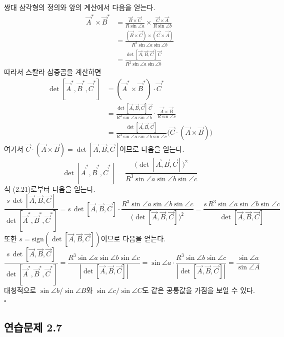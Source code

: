 \documentclass{article}
\begin{document}
쌍대 삼각형의 정의와 앞의 계산에서 다음을 얻는다.
\begin{align*}
  \vec{A}^*\times\vec{B}^*
  &= \frac{\vec{B}\times\vec{C}}{R\sin\angle a}\times\frac{\vec{C}\times\vec{A}}{R\sin\angle b} \\
  &= \frac{(\vec{B}\times\vec{C})\times(\vec{C}\times\vec{A})}{R^2\sin\angle a\sin\angle b} \\
  &= \frac{\det[\vec{A},\vec{B},\vec{C}]\,\vec{C}}{R^2\sin\angle a\sin\angle b}
\end{align*}
따라서 스칼라 삼중곱을 계산하면
\begin{align*}
  \det[\vec{A}^*,\vec{B}^*,\vec{C}^*]
  &= (\vec{A}^*\times\vec{B}^*)\cdot\vec{C}^* \\
  &= \frac{\det[\vec{A},\vec{B},\vec{C}]\,\vec{C}}{R^2\sin\angle a\sin\angle b}
     \cdot\frac{\vec{A}\times\vec{B}}{R\sin\angle c} \\
  &= \frac{\det[\vec{A},\vec{B},\vec{C}]}{R^3\sin\angle a\sin\angle b\sin\angle c}
     \bigl(\vec{C}\cdot(\vec{A}\times\vec{B})\bigr)
\end{align*}
여기서 $\vec{C}\cdot(\vec{A}\times\vec{B}) = \det[\vec{A},\vec{B},\vec{C}]$이므로 다음을 얻는다.
\begin{equation}
  \det[\vec{A}^*,\vec{B}^*,\vec{C}^*]
  = \frac{\bigl(\det[\vec{A},\vec{B},\vec{C}]\bigr)^2}
         {R^3\sin\angle a\sin\angle b\sin\angle c}
  \tag{2.21}
\end{equation}
식 (2.21)로부터 다음을 얻는다.
\[
  \frac{s\,\det[\vec{A},\vec{B},\vec{C}]}{\det[\vec{A}^*,\vec{B}^*,\vec{C}^*]}
  = s\,\det[\vec{A},\vec{B},\vec{C}]\cdot
    \frac{R^3\sin\angle a\sin\angle b\sin\angle c}
         {\bigl(\det[\vec{A},\vec{B},\vec{C}]\bigr)^2}
  = \frac{s\,R^3\sin\angle a\sin\angle b\sin\angle c}{\det[\vec{A},\vec{B},\vec{C}]}
\]
또한 $s = \mathrm{sign}(\det[\vec{A},\vec{B},\vec{C}])$이므로 다음을 얻는다.
\[
  \frac{s\,\det[\vec{A},\vec{B},\vec{C}]}{\det[\vec{A}^*,\vec{B}^*,\vec{C}^*]}
  = \frac{R^3\sin\angle a\sin\angle b\sin\angle c}{|\det[\vec{A},\vec{B},\vec{C}]|}
  = \sin\angle a\cdot\frac{R^3\sin\angle b\sin\angle c}{|\det[\vec{A},\vec{B},\vec{C}]|}
  = \frac{\sin\angle a}{\sin\angle A}
\]
대칭적으로 $\sin\angle b/\sin\angle B$와 $\sin\angle c/\sin\angle C$도 같은 공통값을 가짐을 보일 수 있다.
\hfill $\square$

\subsection*{연습문제 2.7}
\end{document}
